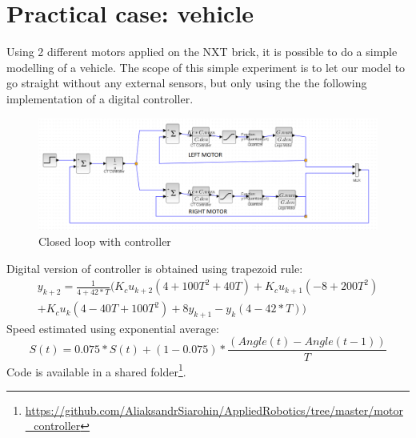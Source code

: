 \documentclass[a4paper,12pt,oneside]{article}
\begin{document}
\section{Practical case: vehicle}
Using 2 different motors applied on the NXT brick, it is possible to do a simple modelling of a vehicle. The scope of this simple experiment is to let our model to go straight without any external sensors, but only using the the following implementation of a digital controller.
\begin{figure}[H]
	\vspace{-1em}
	\centering
	\includegraphics[width=\columnwidth]{./vehicle.png}
	\vspace{-1.5em}	
	\caption{Closed loop with controller}
	\label{fig:closed_loop_controller}
	\vspace{-1em}	
\end{figure}
Digital version of controller is obtained using trapezoid rule:
\begin{multline}
y_{k+2} = \frac{1}{4 + 42 * T} (K_cu_{k+2}(4 + 100T^2 + 40T) + K_cu_{k+1}(-8 + 200T^2) \\+ K_cu_{k}(4 - 40T + 100T^2) + 8y_{k+1} - y_{k}(4 - 42*T))
\end{multline}
Speed estimated using exponential average:
\begin{equation}
S(t) = 0.075 * S(t) + (1 - 0.075) * \frac{(Angle(t) - Angle(t-1))}{T}
\end{equation}
Code is available in a shared folder\footnote{\url{https://github.com/AliaksandrSiarohin/AppliedRobotics/tree/master/motor_controller}}.
\end{document}
